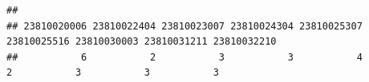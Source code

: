 \documentclass[
]{book}
\newenvironment{Shaded}{\begin{snugshade}}{\end{snugshade}}
\newcommand{\DecValTok}[1]{\textcolor[rgb]{0.00,0.00,0.81}{#1}}
\newcommand{\FunctionTok}[1]{\textcolor[rgb]{0.13,0.29,0.53}{\textbf{#1}}}
\newcommand{\NormalTok}[1]{#1}
\newcommand{\OtherTok}[1]{\textcolor[rgb]{0.56,0.35,0.01}{#1}}
\newcommand{\SpecialCharTok}[1]{\textcolor[rgb]{0.81,0.36,0.00}{\textbf{#1}}}
\begin{document}
\begin{Shaded}
\end{Shaded}

\begin{verbatim}
## 
## 23810020006 23810022404 23810023007 23810024304 23810025307 23810025516 23810030003 23810031211 23810032210 
##           6           2           3           3           4           2           3           3           3
\end{verbatim}

\begin{Shaded}
\end{Shaded}
\end{document}
